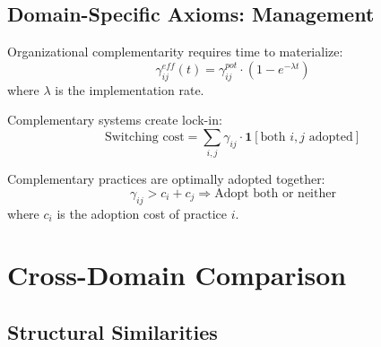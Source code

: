 \subsection{Domain-Specific Axioms: Management}

\begin{axiom}
Organizational complementarity requires time to materialize:
\begin{equation}
\gamma^{eff}_{ij}(t) = \gamma^{pot}_{ij} \cdot (1 - e^{-\lambda t})
\end{equation}
where $\lambda$ is the implementation rate.
\end{axiom}

\begin{axiom}
Complementary systems create lock-in:
\begin{equation}
\text{Switching cost} = \sum_{i,j} \gamma_{ij} \cdot \mathbf{1}[\text{both } i,j \text{ adopted}]
\end{equation}
\end{axiom}

\begin{axiom}
Complementary practices are optimally adopted together:
\begin{equation}
\gamma_{ij} > c_i + c_j \Rightarrow \text{Adopt both or neither}
\end{equation}
where $c_i$ is the adoption cost of practice $i$.
\end{axiom}

\section{Cross-Domain Comparison}
\label{sec:comparison}

\subsection{Structural Similarities}

